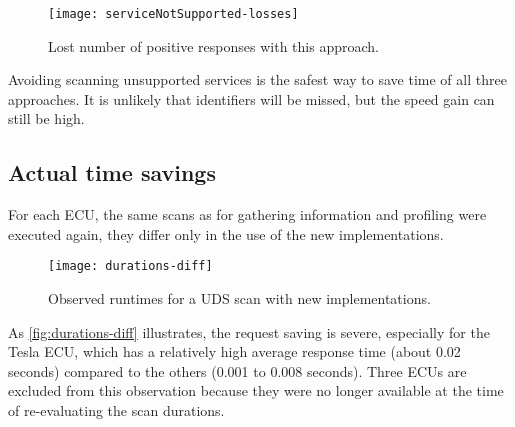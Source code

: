 \begin{figure}[H]
    \centering
    \texttt{[image: serviceNotSupported-losses]}
    \caption{Lost number of positive responses with this approach.}
    \label{fig:serviceNotSupported-losses}
\end{figure}

Avoiding scanning unsupported services is the safest way to save time of all three approaches. It is unlikely that identifiers will be missed, but the speed gain can still be high.

\subsection{Actual time savings}

For each ECU, the same scans as for gathering information and profiling were executed again, they differ only in the use of the new implementations.

\begin{figure}[h]
    \centering
    \texttt{[image: durations-diff]}
    \caption{Observed runtimes for a UDS scan with new implementations.}
    \label{fig:durations-diff}
\end{figure}

As \autoref{fig:durations-diff} illustrates, the request saving is severe, especially for the Tesla ECU, which has a relatively high average response time (about 0.02 seconds) compared to the others (0.001 to 0.008 seconds).
Three ECUs are excluded from this observation because they were no longer available at the time of re-evaluating the scan durations.
